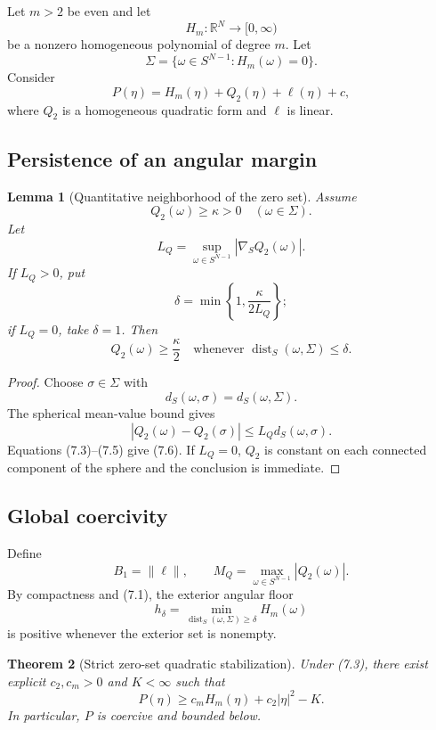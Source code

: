 \documentclass[11pt]{article}
\newtheorem{theorem}{Theorem}[section]
\newtheorem{lemma}[theorem]{Lemma}
\theoremstyle{remark}
\begin{document}
Let \(m>2\) be even and let
\[
 H_m:\mathbb R^N\to[0,\infty)
\]
be a nonzero homogeneous polynomial of degree \(m\).  Let
\[
 \Sigma=\{\omega\in S^{N-1}:H_m(\omega)=0\}.        \tag{7.1}
\]
Consider
\[
 P(\eta)=H_m(\eta)+Q_2(\eta)+\ell(\eta)+c,          \tag{7.2}
\]
where \(Q_2\) is a homogeneous quadratic form and \(\ell\) is linear.

\subsection{Persistence of an angular margin}

\begin{lemma}[Quantitative neighborhood of the zero set]
\label{lem:v17v7-neighborhood}
Assume
\[
 Q_2(\omega)\geq\kappa>0
 \quad(\omega\in\Sigma).                            \tag{7.3}
\]
Let
\[
 L_Q=
 \sup_{\omega\in S^{N-1}}
 |\nabla_SQ_2(\omega)|.                             \tag{7.4}
\]
If \(L_Q>0\), put
\[
 \delta=\min\left\{1,\frac{\kappa}{2L_Q}\right\};
                                                               \tag{7.5}
\]
if \(L_Q=0\), take \(\delta=1\).  Then
\[
 Q_2(\omega)\geq\frac{\kappa}{2}
 \quad\text{whenever }\operatorname{dist}_S(\omega,\Sigma)
 \leq\delta.                                       \tag{7.6}
\]
\end{lemma}

\begin{proof}
Choose \(\sigma\in\Sigma\) with
\[
 d_S(\omega,\sigma)=d_S(\omega,\Sigma).
\]
The spherical mean-value bound gives
\[
 |Q_2(\omega)-Q_2(\sigma)|
 \leq L_Qd_S(\omega,\sigma).
\]
Equations (7.3)--(7.5) give (7.6).  If \(L_Q=0\),
\(Q_2\) is constant on each connected component of the sphere and
the conclusion is immediate.
\end{proof}

\subsection{Global coercivity}

Define
\[
 B_1=\|\ell\|,\qquad
 M_Q=\max_{\omega\in S^{N-1}}|Q_2(\omega)|.         \tag{7.7}
\]
By compactness and (7.1), the exterior angular floor
\[
 h_\delta=
 \min_{\operatorname{dist}_S(\omega,\Sigma)\geq\delta}
 H_m(\omega)                                       \tag{7.8}
\]
is positive whenever the exterior set is nonempty.

\begin{theorem}[Strict zero-set quadratic stabilization]
\label{thm:v17v7-strict}
Under (7.3), there exist explicit \(c_2,c_m>0\) and \(K<\infty\)
such that
\[
 P(\eta)
 \geq
 c_mH_m(\eta)+c_2|\eta|^2-K.                       \tag{7.9}
\]
In particular, \(P\) is coercive and bounded below.
\end{theorem}
\end{document}
